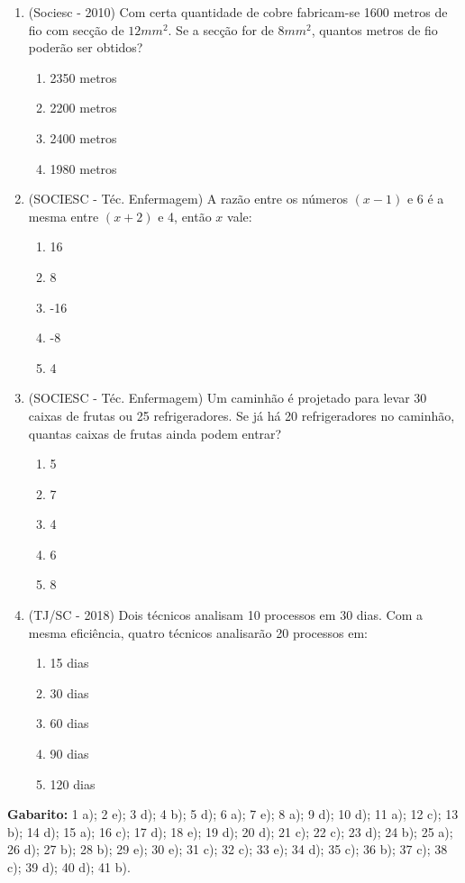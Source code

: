 \begin{enumerate}
 \item (Sociesc - 2010) Com certa quantidade de cobre fabricam-se 1600 metros de fio com secção de $12 mm^2$. Se a secção for de $8mm^2$, quantos metros de fio poderão ser obtidos?
  \begin{enumerate}
  \item 2350 metros
  \item 2200 metros
  \item 2400 metros
  \item 1980 metros
 \end{enumerate}
 
 \item (SOCIESC - Téc. Enfermagem) A razão entre os números $(x-1)$ e 6 é a mesma entre $(x+2)$ e 4, então $x$ vale:
  \begin{enumerate}
  \item 16
  \item 8
  \item -16
  \item -8
  \item 4
 \end{enumerate}
 
 \item (SOCIESC - Téc. Enfermagem) Um caminhão é projetado para levar 30 caixas de frutas ou 25 refrigeradores. Se já há 20 refrigeradores no caminhão, quantas caixas de frutas ainda podem entrar?
 \begin{enumerate}
  \item 5
  \item 7
  \item 4
  \item 6
  \item 8
 \end{enumerate}
 
 \item (TJ/SC - 2018) Dois técnicos analisam 10 processos em 30 dias. Com a mesma eficiência, quatro técnicos analisarão 20 processos em:
    \begin{enumerate}
    \item 15 dias
    \item 30 dias
    \item 60 dias
    \item 90 dias
    \item 120 dias
    \end{enumerate}

\end{enumerate}

 \textbf{Gabarito:} 1 a); 2 e); 3 d); 4 b); 5 d); 6 a); 7 e); 8 a); 9 d); 10 d); 11 a); 12 c); 13 b); 14 d); 15 a); 16 c); 17 d); 18 e); 19 d); 20 d); 21 c); 22 c); 23 d); 24 b); 25 a); 26 d); 27 b); 28 b); 29 e); 30 e); 31 c); 32 c); 33 e); 34 d); 35 c); 36 b); 37 c); 38 c); 39 d); 40 d); 41 b).


